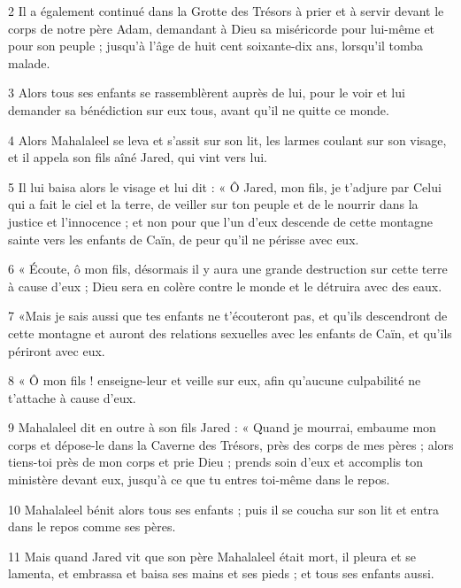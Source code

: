 \par 2 Il a également continué dans la Grotte des Trésors à prier et à servir devant le corps de notre père Adam, demandant à Dieu sa miséricorde pour lui-même et pour son peuple ; jusqu'à l'âge de huit cent soixante-dix ans, lorsqu'il tomba malade.

\par 3 Alors tous ses enfants se rassemblèrent auprès de lui, pour le voir et lui demander sa bénédiction sur eux tous, avant qu'il ne quitte ce monde.

\par 4 Alors Mahalaleel se leva et s'assit sur son lit, les larmes coulant sur son visage, et il appela son fils aîné Jared, qui vint vers lui.

\par 5 Il lui baisa alors le visage et lui dit : « Ô Jared, mon fils, je t'adjure par Celui qui a fait le ciel et la terre, de veiller sur ton peuple et de le nourrir dans la justice et l'innocence ; et non pour que l'un d'eux descende de cette montagne sainte vers les enfants de Caïn, de peur qu'il ne périsse avec eux.

\par 6 « Écoute, ô mon fils, désormais il y aura une grande destruction sur cette terre à cause d'eux ; Dieu sera en colère contre le monde et le détruira avec des eaux.

\par 7 «Mais je sais aussi que tes enfants ne t'écouteront pas, et qu'ils descendront de cette montagne et auront des relations sexuelles avec les enfants de Caïn, et qu'ils périront avec eux.

\par 8 « Ô mon fils ! enseigne-leur et veille sur eux, afin qu'aucune culpabilité ne t'attache à cause d'eux.

\par 9 Mahalaleel dit en outre à son fils Jared : « Quand je mourrai, embaume mon corps et dépose-le dans la Caverne des Trésors, près des corps de mes pères ; alors tiens-toi près de mon corps et prie Dieu ; prends soin d'eux et accomplis ton ministère devant eux, jusqu'à ce que tu entres toi-même dans le repos.

\par 10 Mahalaleel bénit alors tous ses enfants ; puis il se coucha sur son lit et entra dans le repos comme ses pères.

\par 11 Mais quand Jared vit que son père Mahalaleel était mort, il pleura et se lamenta, et embrassa et baisa ses mains et ses pieds ; et tous ses enfants aussi.

